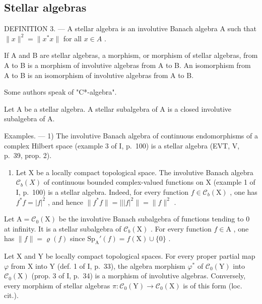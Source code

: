 \subsection{Stellar algebras}

DEFINITION 3. --- A stellar algebra is an involutive Banach algebra A such that \(\|x\|^{2}=\|x^{*}x\|\) for all \(x\in A\) .

If A and B are stellar algebras, a morphism, or morphism of stellar algebras, from A to B is a morphism of involutive algebras from A to B. An isomorphism from A to B is an isomorphism of involutive algebras from A to B.

Some authors speak of "C*-algebra".

Let A be a stellar algebra. A stellar subalgebra of A is a closed involutive subalgebra of A.

Examples. --- 1) The involutive Banach algebra of continuous endomorphisms of a complex Hilbert space (example 3 of I, p.~100) is a stellar algebra (EVT, V, p.~39, prop. 2).

\begin{enumerate}
\def\labelenumi{\arabic{enumi})}
\setcounter{enumi}{1}
\tightlist
\item
  Let X be a locally compact topological space. The involutive Banach algebra \(\mathcal{C}_{b}(X)\) of continuous bounded complex-valued functions on X (example 1 of I, p.~100) is a stellar algebra. Indeed, for every function \(f \in \mathcal{C}_b(\mathrm{X})\) , one has \(f^*f = |f|^2\) , and hence \(\| f^*f \| = |||f|^2 \| = \| f\|^2\) .
\end{enumerate}

Let \(\mathrm{A} = \mathcal{C}_0(\mathrm{X})\) be the involutive Banach subalgebra of functions tending to 0 at infinity. It is a stellar subalgebra of \(\mathcal{C}_b(\mathrm{X})\) . For every function \(f \in \mathrm{A}\) , one has \(\| f \| = \varrho(f)\) since \(\mathrm{Sp}_{\mathrm{A}}'(f) = f(\mathrm{X}) \cup \{0\}\) .

Let X and Y be locally compact topological spaces. For every proper partial map \(\varphi\) from X into Y (def. 1 of I, p.~33), the algebra morphism \(\varphi^{*}\) of \(\mathcal{C}_{0}(\mathrm{Y})\) into \(\mathcal{C}_{0}(\mathrm{X})\) (prop. 3 of I, p.~34) is a morphism of involutive algebras. Conversely, every morphism of stellar algebras \(\pi\colon\mathcal{C}_{0}(\mathrm{Y})\to\mathcal{C}_{0}(\mathrm{X})\) is of this form (loc. cit.).

